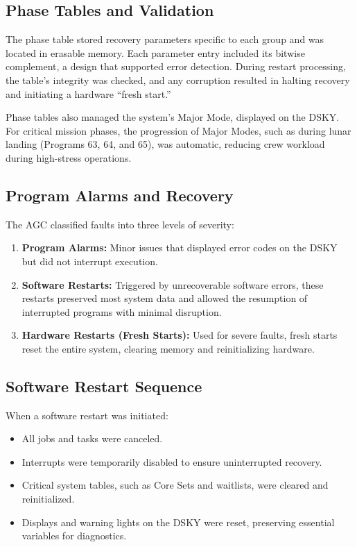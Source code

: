 \documentclass[oxford]{ahsan}
\begin{document}
\subsection{Phase Tables and Validation}

The phase table stored recovery parameters specific to each group and was located in
erasable memory. Each parameter entry included its bitwise complement, a design that
supported error detection. During restart processing, the table's integrity was
checked, and any corruption resulted in halting recovery and initiating a hardware
``fresh start.''

Phase tables also managed the system's Major Mode, displayed on the DSKY. For critical
mission phases, the progression of Major Modes, such as during lunar landing (Programs
63, 64, and 65), was automatic, reducing crew workload during high-stress operations.

\subsection{Program Alarms and Recovery}

The AGC classified faults into three levels of severity:
\begin{enumerate}
    \item \textbf{Program Alarms:} Minor issues that displayed error codes on the DSKY but did not interrupt execution.
    \item \textbf{Software Restarts:} Triggered by unrecoverable software errors, these restarts preserved most system data and allowed the resumption of interrupted programs with minimal disruption.
    \item \textbf{Hardware Restarts (Fresh Starts):} Used for severe faults, fresh starts reset the entire system, clearing memory and reinitializing hardware.
\end{enumerate}

\subsection{Software Restart Sequence}

When a software restart was initiated:
\begin{itemize}
    \item All jobs and tasks were canceled.
    \item Interrupts were temporarily disabled to ensure uninterrupted recovery.
    \item Critical system tables, such as Core Sets and waitlists, were cleared and reinitialized.
    \item Displays and warning lights on the DSKY were reset, preserving essential variables for diagnostics.
\end{itemize}
\end{document}

